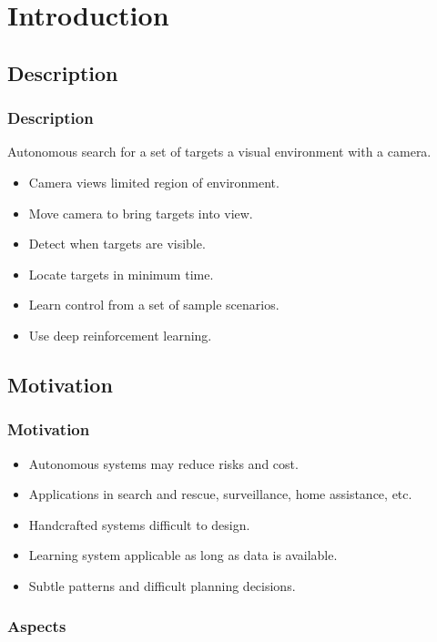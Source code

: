 
\section{Introduction}

\subsection{Description}

\begin{frame}
    \frametitle{Description}
    
    Autonomous search for a set of targets a visual environment with a camera.
    
    \begin{itemize}
        \item Camera views limited region of environment. 
        \item Move camera to bring targets into view.
        \item Detect when targets are visible.
        \item Locate targets in minimum time.
        \item Learn control from a set of sample scenarios.
        \item Use deep reinforcement learning.
    \end{itemize}
\end{frame}

\subsection{Motivation}

\begin{frame}
    \frametitle{Motivation}
    
    \begin{itemize}
        \item Autonomous systems may reduce risks and cost.
        \item Applications in search and rescue, surveillance, home assistance, etc.
        \item Handcrafted systems difficult to design.
        \item Learning system applicable as long as data is available. 
        \item Subtle patterns and difficult planning decisions.
    \end{itemize}
\end{frame}

\frametitle{Aspects}

